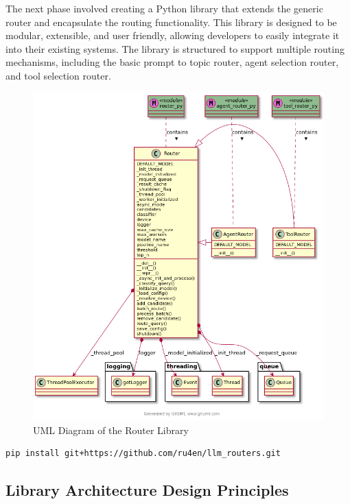 


The next phase involved creating a Python library that extends the generic router and encapsulate the routing functionality. This library is designed to be modular, extensible, and user friendly, allowing developers to easily integrate
it into their existing systems. The library is structured to support
multiple routing mechanisms, including the basic prompt to topic router,
agent selection router, and tool selection router.



\begin{figure}[H]
    \centering
    \includegraphics[width=1.0\textwidth]{figures/UML.png}
    \caption{UML Diagram of the Router Library}
    \label{fig:uml_diagram}
\end{figure}




\begin{verbatim}
pip install git+https://github.com/ru4en/llm_routers.git
\end{verbatim}


\subsection{Library Architecture Design Principles}

